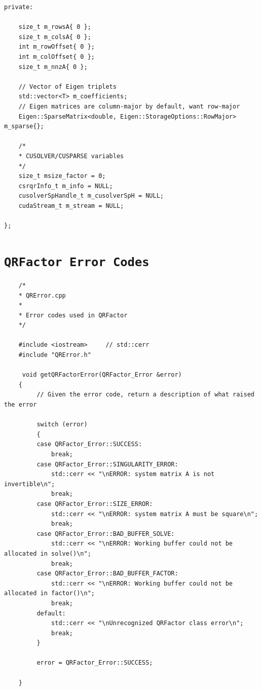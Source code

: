 \documentclass[11pt,letterpaper]{article}
\begin{document}
\begin{verbatim}
private:

	size_t m_rowsA{ 0 };
	size_t m_colsA{ 0 };
	int m_rowOffset{ 0 };
	int m_colOffset{ 0 };
	size_t m_nnzA{ 0 };

	// Vector of Eigen triplets
	std::vector<T> m_coefficients;	
	// Eigen matrices are column-major by default, want row-major
	Eigen::SparseMatrix<double, Eigen::StorageOptions::RowMajor> m_sparse{}; 

	/*
	* CUSOLVER/CUSPARSE variables 
	*/
	size_t msize_factor = 0;		
	csrqrInfo_t m_info = NULL;
	cusolverSpHandle_t m_cusolverSpH = NULL;
	cudaStream_t m_stream = NULL;
	
};
\end{verbatim}

\section{\texttt{QRFactor Error Codes}}
\label{sec: Error Codes}

\begin{verbatim}
    /*
    * QRError.cpp
    *
    * Error codes used in QRFactor
    */

    #include <iostream>		// std::cerr
    #include "QRError.h"
    
     void getQRFactorError(QRFactor_Error &error)
    {
         // Given the error code, return a description of what raised the error
    
         switch (error)
         {
         case QRFactor_Error::SUCCESS:
             break;
         case QRFactor_Error::SINGULARITY_ERROR:
             std::cerr << "\nERROR: system matrix A is not invertible\n";
             break;
         case QRFactor_Error::SIZE_ERROR:
             std::cerr << "\nERROR: system matrix A must be square\n";
             break;
         case QRFactor_Error::BAD_BUFFER_SOLVE:
             std::cerr << "\nERROR: Working buffer could not be allocated in solve()\n";
             break;
         case QRFactor_Error::BAD_BUFFER_FACTOR:
             std::cerr << "\nERROR: Working buffer could not be allocated in factor()\n";
             break;
         default:
             std::cerr << "\nUnrecognized QRFactor class error\n";
             break;
         }
    
         error = QRFactor_Error::SUCCESS;
    
    }
    
\end{verbatim}


\end{document}

